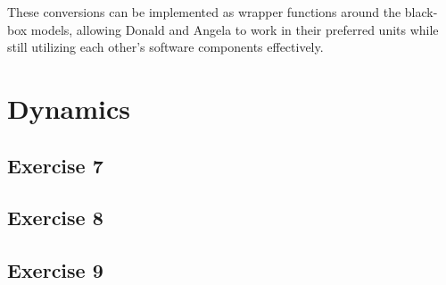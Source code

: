 \begin{solution}
These conversions can be implemented as wrapper functions around the black-box models, allowing Donald and Angela to work in their preferred units while still utilizing each other's software components effectively.

\end{solution}


\section{Dynamics}
\subsection{Exercise 7}
\lipsum[13]

\begin{solution}
    \lipsum[14]
\end{solution}

\subsection{Exercise 8}
\lipsum[15]

\begin{solution}
    \lipsum[16]
\end{solution}

\subsection{Exercise 9}
\lipsum[17]

\begin{solution}
    \lipsum[18]
\end{solution}
